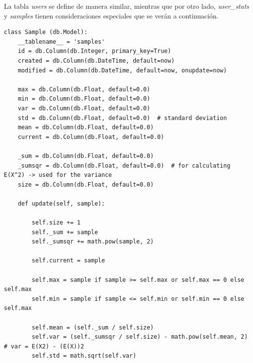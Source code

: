 \documentclass[11pt,letterpaper]{article}
\begin{document}
La tabla \emph{users} se define de manera similar, mientras que por otro lado, \emph{user\_stats} y \emph{samples} tienen consideraciones especiales que se verán a continuación.\\

\begin{lstlisting}[title=Modelo de la tabla \emph{samples}]
class Sample (db.Model):
    __tablename__ = 'samples'
    id = db.Column(db.Integer, primary_key=True)
    created = db.Column(db.DateTime, default=now)
    modified = db.Column(db.DateTime, default=now, onupdate=now)

    max = db.Column(db.Float, default=0.0)
    min = db.Column(db.Float, default=0.0)
    var = db.Column(db.Float, default=0.0)
    std = db.Column(db.Float, default=0.0)  # standard deviation
    mean = db.Column(db.Float, default=0.0)
    current = db.Column(db.Float, default=0.0)

    _sum = db.Column(db.Float, default=0.0)
    _sumsqr = db.Column(db.Float, default=0.0)  # for calculating E(X^2) -> used for the variance
    size = db.Column(db.Float, default=0.0)

    def update(self, sample):

        self.size += 1
        self._sum += sample
        self._sumsqr += math.pow(sample, 2)

        self.current = sample

        self.max = sample if sample >= self.max or self.max == 0 else self.max
        self.min = sample if sample <= self.min or self.min == 0 else self.max

        self.mean = (self._sum / self.size)
        self.var = (self._sumsqr / self.size) - math.pow(self.mean, 2)  # var = E(X2) - (E(X))2
        self.std = math.sqrt(self.var)
\end{lstlisting}
\end{document}
